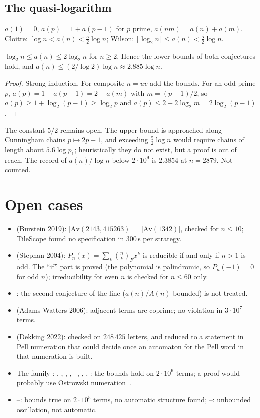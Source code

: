 \subsection{The quasi-logarithm }
$a(1)=0$, $a(p)=1+a(p-1)$ for $p$ prime, $a(nm)=a(n)+a(m)$. Cloitre: $\log n<a(n)<\frac52\log n$; Wilson:
$\lfloor\log_2n\rfloor\le a(n)<\frac52\log n$.
\begin{proposition} $\log_2n\le a(n)\le2\log_2n$ for $n\ge2$. Hence the lower bounds of both conjectures hold, and
$a(n)\le(2/\log2)\log n\approx2.885\log n$.\end{proposition}
\begin{proof} Strong induction. For composite $n=uv$ add the bounds. For an odd prime $p$,
$a(p)=1+a(p-1)=2+a(m)$ with $m=(p-1)/2$, so $a(p)\ge1+\log_2(p-1)\ge\log_2p$ and $a(p)\le2+2\log_2m=2\log_2(p-1)$.
\end{proof}
The constant $5/2$ remains open. The upper bound is approached along Cunningham chains $p\mapsto2p+1$, and exceeding
$\frac52\log n$ would require chains of length about $5.6\log p_1$; heuristically they do not exist, but a proof is out
of reach. The record of $a(n)/\log n$ below $2\cdot10^9$ is $2.3854$ at $n=2879$. Not counted.

\section{Open cases}\label{s:open}
\begin{itemize}
\item {} (Burstein 2019): $|\mathrm{Av}(2143,415263)|=|\mathrm{Av}(1342)|$, checked for $n\le10$;
  TileScope found no specification in $300$\,s per strategy.
\item {} (Stephan 2004): $P_n(x)=\sum_k\binom nk_Fx^k$ is reducible if and only if $n>1$ is odd. The
  ``if'' part is proved (the polynomial is palindromic, so $P_n(-1)=0$ for odd $n$); irreducibility for even $n$
  is checked for $n\le60$ only.
\item {}: the second conjecture of the line ($a(n)/A(n)$ bounded) is not treated.
\item {} (Adams-Watters 2006): adjacent terms are coprime; no violation in $3\cdot10^7$ terms.
\item {} (Dekking 2022): checked on $248\,425$ letters, and reduced to a statement in Pell numeration
  that \Walnut{} could decide once an automaton for the Pell word in that numeration is built.
\item The family : , , , ,
  --, , , : the bounds hold on $2\cdot10^6$ terms;
  a proof would probably use Ostrowski numeration~\cite{SSZ}.
\item {}--: bounds true on $2\cdot10^5$ terms, no automatic structure found;
  --: unbounded oscillation, not automatic.
\end{itemize}

